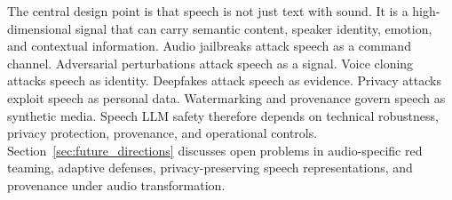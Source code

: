 The central design point is that speech is not just text with sound. It is a high-dimensional signal that can carry semantic content, speaker identity, emotion, and contextual information. Audio jailbreaks attack speech as a command channel. Adversarial perturbations attack speech as a signal. Voice cloning attacks speech as identity. Deepfakes attack speech as evidence. Privacy attacks exploit speech as personal data. Watermarking and provenance govern speech as synthetic media. Speech LLM safety therefore depends on technical robustness, privacy protection, provenance, and operational controls. Section~\ref{sec:future_directions} discusses open problems in audio-specific red teaming, adaptive defenses, privacy-preserving speech representations, and provenance under audio transformation.

